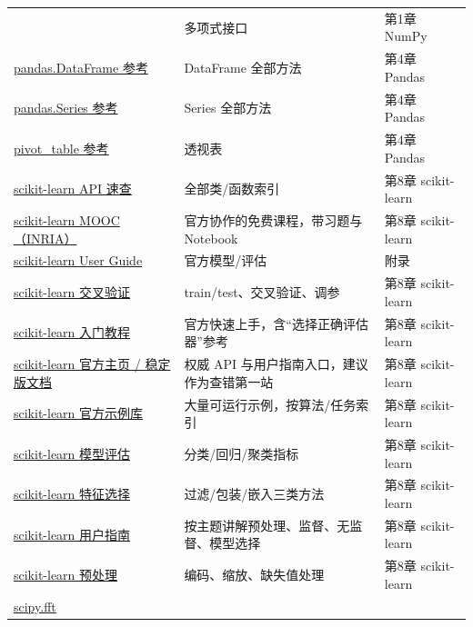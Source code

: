 {\begin{longtable}[]
{参考} & 多项式接口 & 第1章 NumPy \\
\href{https://pandas.pydata.org/docs/reference/api/pandas.DataFrame.html}{pandas.DataFrame
参考} & DataFrame 全部方法 & 第4章 Pandas \\
\href{https://pandas.pydata.org/docs/reference/api/pandas.Series.html}{pandas.Series
参考} & Series 全部方法 & 第4章 Pandas \\
\href{https://pandas.pydata.org/docs/reference/api/pandas.pivot_table.html}{pivot\_table
参考} & 透视表 & 第4章 Pandas \\
\href{https://scikit-learn.org/stable/modules/classes.html}{scikit-learn
API 速查} & 全部类/函数索引 & 第8章 scikit-learn \\
\href{https://inria.github.io/scikit-learn-mooc/}{scikit-learn
MOOC（INRIA）} & 官方协作的免费课程，带习题与 Notebook & 第8章
scikit-learn \\
\href{https://scikit-learn.org/stable/user_guide.html}{scikit-learn User
Guide} & 官方模型/评估 & 附录 \\
\href{https://scikit-learn.org/stable/modules/cross_validation.html}{scikit-learn
交叉验证} & train/test、交叉验证、调参 & 第8章 scikit-learn \\
\href{https://scikit-learn.org/stable/tutorial/index.html}{scikit-learn
入门教程} & 官方快速上手，含``选择正确评估器''参考 & 第8章
scikit-learn \\
\href{https://scikit-learn.org/stable/}{scikit-learn 官方主页 /
稳定版文档} & 权威 API 与用户指南入口，建议作为查错第一站 & 第8章
scikit-learn \\
\href{https://scikit-learn.org/stable/auto_examples/index.html}{scikit-learn
官方示例库} & 大量可运行示例，按算法/任务索引 & 第8章 scikit-learn \\
\href{https://scikit-learn.org/stable/modules/model_evaluation.html}{scikit-learn
模型评估} & 分类/回归/聚类指标 & 第8章 scikit-learn \\
\href{https://scikit-learn.org/stable/modules/feature_selection.html}{scikit-learn
特征选择} & 过滤/包装/嵌入三类方法 & 第8章 scikit-learn \\
\href{https://scikit-learn.org/stable/user_guide.html}{scikit-learn
用户指南} & 按主题讲解预处理、监督、无监督、模型选择 & 第8章
scikit-learn \\
\href{https://scikit-learn.org/stable/modules/preprocessing.html}{scikit-learn
预处理} & 编码、缩放、缺失值处理 & 第8章 scikit-learn \\
\href{https://docs.scipy.org/doc/scipy/reference/fft.html}{scipy.fft
}
\end{longtable}}
